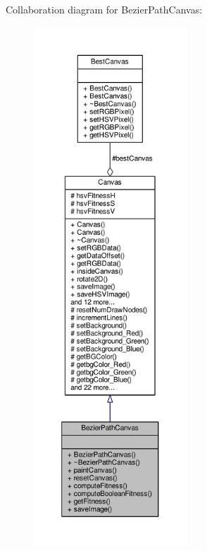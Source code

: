 Collaboration diagram for Bezier\+Path\+Canvas\+:
\nopagebreak
\begin{figure}[H]
\begin{center}
\leavevmode
\includegraphics[height=550pt]{classBezierPathCanvas__coll__graph}
\end{center}
\end{figure}
